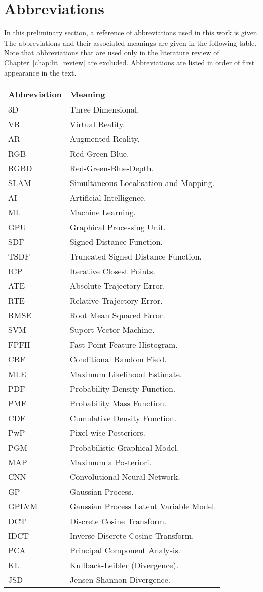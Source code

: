 \section*{Abbreviations}
In this preliminary section, a reference of abbreviations used in this work is given. The 
abbreviations and their associated meanings are given in the following table. Note that 
abbreviations that are used only in the literature review of Chapter~\ref{chap:lit_review} 
are excluded. Abbreviations are listed in order of first appearance in the text.
\begin{longtable}{p{} | p{}}
  \hline
  Abbreviation & Meaning \\
  \hline
  3D & Three Dimensional.\\
  VR & Virtual Reality.\\
  AR & Augmented Reality.\\
  RGB & Red-Green-Blue.\\
  RGBD & Red-Green-Blue-Depth.\\
  SLAM & Simultaneous Localisation and Mapping.\\
  AI & Artificial Intelligence.\\
  ML & Machine Learning.\\
  GPU & Graphical Processing Unit.\\
  SDF & Signed Distance Function.\\
  \hline
  TSDF & Truncated Signed Distance Function.\\
  ICP & Iterative Closest Points.\\
  ATE & Absolute Trajectory Error.\\
  RTE & Relative Trajectory Error.\\
  RMSE & Root Mean Squared Error.\\
  SVM & Suport Vector Machine.\\
  FPFH & Fast Point Feature Histogram.\\
  \hline
  CRF & Conditional Random Field.\\
  MLE & Maximum Likelihood Estimate.\\
  PDF & Probability Density Function.\\
  PMF & Probability Mass Function.\\
  CDF & Cumulative Density Function.\\
  PwP & Pixel-wise-Posteriors.\\
  PGM & Probabilistic Graphical Model.\\
  MAP & Maximum a Posteriori.\\
  CNN & Convolutional Neural Network.\\
  GP & Gaussian Process.\\
  GPLVM & Gaussian Process Latent Variable Model.\\
  DCT & Discrete Cosine Transform.\\
  IDCT & Inverse Discrete Cosine Transform.\\
  PCA & Principal Component Analysis.\\
  KL & Kullback-Leibler (Divergence).\\
  JSD & Jensen-Shannon Divergence.
~\label{table:abbreviations}
\end{longtable}